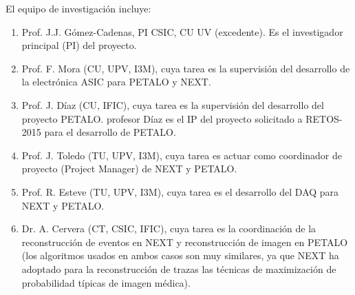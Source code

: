 El equipo de investigación incluye: 

\begin{enumerate}
\item Prof. J.J. Gómez-Cadenas, PI CSIC, CU UV (excedente). Es el investigador principal (PI) del proyecto. 
\item Prof. F. Mora (CU, UPV, I3M), cuya tarea es la supervisión del desarrollo de la electrónica ASIC para PETALO y NEXT.
\item Prof. J. Díaz (CU, IFIC), cuya tarea es la supervisión del desarrollo del proyecto PETALO.
profesor Díaz es el IP del proyecto solicitado a RETOS-2015 para el desarrollo de PETALO. 
\item Prof. J. Toledo (TU, UPV, I3M), cuya tarea es actuar como coordinador de proyecto (Project Manager) de NEXT y PETALO.
\item Prof. R. Esteve (TU, UPV, I3M), cuya tarea es el desarrollo del DAQ para NEXT y PETALO.
\item Dr. A. Cervera (CT, CSIC, IFIC), cuya tarea es la coordinación de la reconstrucción de eventos en NEXT y reconstrucción de imagen en PETALO (los algoritmos usados en ambos casos son muy similares, ya que NEXT ha adoptado para la reconstrucción de trazas las técnicas de maximización de probabilidad típicas de imagen médica).
\end{enumerate}

